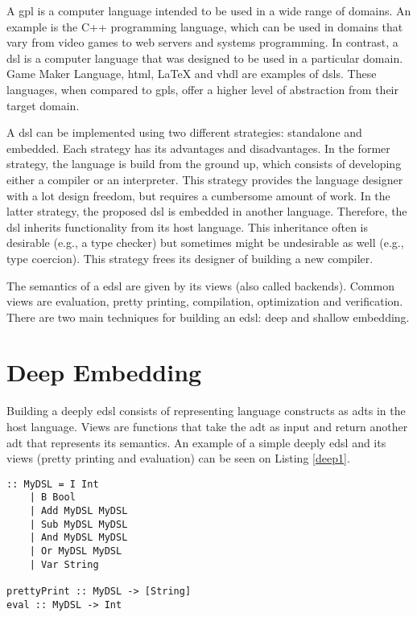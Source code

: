A \ac{gpl} is a computer language intended to be used in a wide range of domains. An example is the C++ programming language, which can be used in domains that vary from video games to web servers and systems programming. In contrast, a \ac{dsl} is a computer language that was designed to be used in a particular domain. Game Maker Language, \acs{html}, LaTeX and \acs{vhdl} are examples of \acp{dsl}. These languages, when compared to \acp{gpl}, offer a higher level of abstraction from their target domain.

A \ac{dsl} can be implemented using two different strategies: standalone and embedded. Each strategy has its advantages and disadvantages. In the former strategy, the language is build from the ground up, which consists of developing either a compiler or an interpreter. This strategy provides the language designer with a lot design freedom, but requires a cumbersome amount of work. In the latter strategy, the proposed \ac{dsl} is embedded in another language. Therefore, the \ac{dsl} inherits functionality from its host language. This inheritance often is desirable (e.g., a type checker) but sometimes might be undesirable as well (e.g., type coercion). This strategy frees its designer of building a new compiler.

The semantics of a \ac{edsl} are given by its views (also called backends). Common views are evaluation, pretty printing, compilation, optimization and verification. There are two main techniques for building an \ac{edsl}: deep and shallow embedding.

\section{Deep Embedding}

Building a deeply \ac{edsl} consists of representing language constructs as \acp{adt} in the host language. Views are functions that take the \ac{adt} as input and return another \ac{adt} that represents its semantics. An example of a simple deeply \ac{edsl} and its views (pretty printing and evaluation) can be seen on Listing \ref{deep1}.


\begin{lstlisting}[caption=A simple deeply \ac{edsl} and its views,captionpos=b,label=deep1]
:: MyDSL = I Int
    | B Bool
    | Add MyDSL MyDSL
    | Sub MyDSL MyDSL
    | And MyDSL MyDSL
    | Or MyDSL MyDSL
    | Var String
    
prettyPrint :: MyDSL -> [String]
eval :: MyDSL -> Int
\end{lstlisting}

